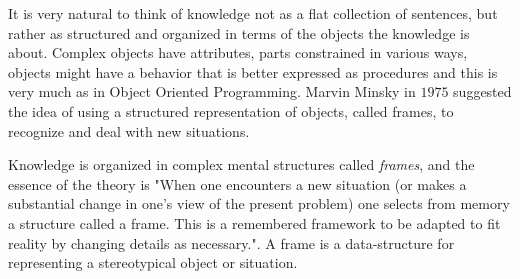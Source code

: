 It is very natural to think of knowledge not as a flat collection of sentences, but
rather as structured and organized in terms of the objects the knowledge is about.\newline
Complex objects have attributes, parts constrained in various ways, objects might have
a behavior that is better expressed as procedures and this is very much
as in Object Oriented Programming.\newline
Marvin Minsky in $1975$ suggested the idea of using a structured representation
of objects, called frames, to recognize and deal with new situations.

Knowledge is organized in complex mental structures called \emph{frames}, and 
the essence of the theory is "When one encounters a new situation (or makes a 
substantial change in one's view of the present problem) one selects from memory
a structure called a frame.\newline
This is a remembered framework to be adapted to fit reality 
by changing details as necessary.".\newline
A frame is a data-structure for representing a stereotypical object or situation.

